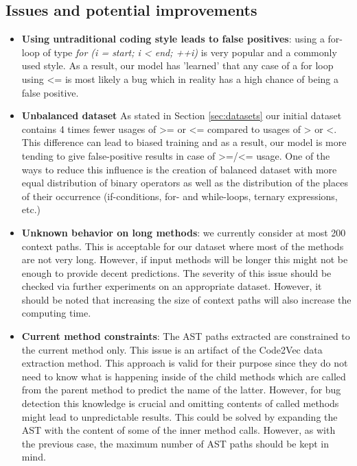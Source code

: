 \subsection{Issues and potential improvements}
\begin{itemize}
    \item {\textbf{Using untraditional coding style leads to false positives}: using a for-loop of type \textit{for (i = start; i < end; ++i)} is very popular and a commonly used style. As a result, our model has 'learned' that any case of a for loop using <= is most likely a bug which in reality has a high chance of being a false positive. }
    
    \item{\textbf{Unbalanced dataset}
    As stated in Section \ref{sec:datasets} our initial dataset contains 4 times fewer usages of >= or <= compared to usages of > or <. This difference can lead to biased training and as a result, our model is more tending to give false-positive results in case of >=/<= usage. One of the ways to reduce this influence is the creation of balanced dataset with more equal distribution of binary operators as well as the distribution of the places of their occurrence (if-conditions, for- and while-loops, ternary expressions, etc.)}
    
    \item {\textbf{Unknown behavior on long methods}: we currently consider at most 200 context paths. This is acceptable for our dataset where most of the methods are not very long. However, if input methods will be longer this might not be enough to provide decent predictions. The severity of this issue should be checked via further experiments on an appropriate dataset. However, it should be noted that increasing the size of context paths will also increase the computing time.}
    
    \item {\textbf{Current method constraints}: The AST paths extracted are constrained to the current method only. This issue is an artifact of the Code2Vec data extraction method. This approach is valid for their purpose since they do not need to know what is happening inside of the child methods which are called from the parent method to predict the name of the latter. However, for bug detection this knowledge is crucial and omitting contents of called methods might lead to unpredictable results. This could be solved by expanding the AST with the content of some of the inner method calls. However, as with the previous case, the maximum number of AST paths should be kept in mind.}
    

\end{itemize}
